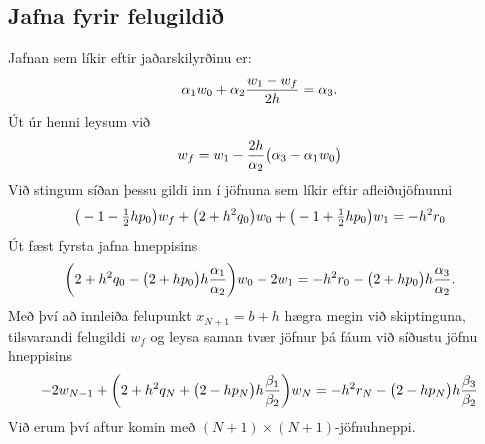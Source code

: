 \documentclass[letterpaper,10pt,icelandic]{sphinxmanual}
\begin{document}
\subsection{Jafna fyrir felugildið}
\label{kafli07:jafna-fyrir-felugildi}
Jafnan sem líkir eftir jaðarskilyrðinu er:
\begin{gather}
\begin{split}\alpha_1w_0+\alpha_2 \dfrac{w_1-w_f}{2h}=\alpha_3.\end{split}\notag
\end{gather}
Út úr henni leysum við
\begin{gather}
\begin{split}w_f=w_1-\dfrac{2h}{\alpha_2}\big(\alpha_3-\alpha_1w_0\big)\end{split}\notag
\end{gather}
Við stingum síðan þessu gildi inn í jöfnuna sem líkir eftir
afleiðujöfnunni
\begin{gather}
\begin{split}\big(-1-\tfrac 12 hp_0\big)w_f+\big(2+h^2 q_0\big)w_0
+\big(-1+\tfrac 12 hp_0\big)w_1=-h^2r_0\end{split}\notag
\end{gather}
Út fæst fyrsta jafna hneppisins
\begin{gather}
\begin{split}\bigg(2+h^2q_0-\big(2+hp_0\big)h\dfrac{\alpha_1}{\alpha_2}\bigg)w_0
-2w_1=-h^2r_0-\big(2+hp_0\big)h\dfrac{\alpha_3}{\alpha_2}.\end{split}\notag
\end{gather}
Með því að innleiða felupunkt \(x_{N+1}=b+h\) hægra megin við
skiptinguna, tilsvarandi felugildi \(w_f\) og leysa saman tvær
jöfnur þá fáum við síðustu jöfnu hneppisins
\begin{gather}
\begin{split}-2w_{N-1}
+\bigg(2+h^2q_N+\big(2-hp_N\big)h\dfrac{\beta_1}{\beta_2}\bigg)w_N
=-h^2r_N-\big(2-hp_N\big)h\dfrac{\beta_3}{\beta_2}\end{split}\notag
\end{gather}
Við erum því aftur komin með \((N+1)\times (N+1)\)-jöfnuhneppi.
\end{document}
